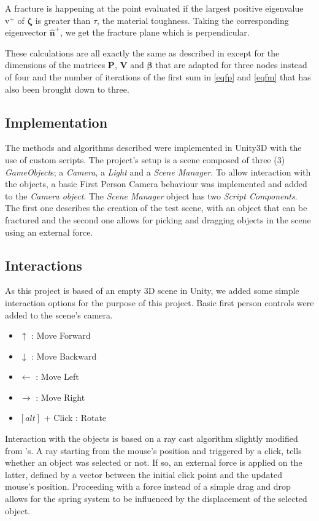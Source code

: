 \documentclass[tog]{acmsiggraph}
\begin{document}
A fracture is happening at the point evaluated if the largest positive eigenvalue $\mathrm{v}^+$ of $\pmb{\zeta}$ is greater than $\tau$, the material toughness. Taking the corresponding eigenvector $\mathrm{\pmb{\hat{n}}}^+$, we get the fracture plane which is perpendicular. 

These calculations are all exactly the same as described in \cite{Obrien:1999:GMA} except for the dimensions of the matrices $\pmb{P}$, $\pmb{V}$ and $\pmb{\beta}$ that are adapted for three nodes instead of four and the number of iterations of the first sum in \eqref{eqfp} and \eqref{eqfm} that has also been brought down to three. 

\subsection{Implementation}
The methods and algorithms described were implemented in Unity3D with the use of custom scripts. The project's setup is a scene composed of three (3) \textit{GameObject}s; a \textit{Camera}, a \textit{Light} and a \textit{Scene Manager}. To allow interaction with the objects, a basic First Person Camera behaviour was implemented and added to the \textit{Camera object}. The \textit{Scene Manager} object has two \textit{Script Components}. The first one describes the creation of the test scene, with an object that can be fractured and the second one allows for picking and dragging objects in the scene using an external force. 

\subsection{Interactions}
As this project is based of an empty 3D scene in Unity, we added some simple interaction options for the purpose of this project. Basic first person controls were added to the scene's camera. 

\begin{itemize}
\setlength\itemsep{0em}
\item $\uparrow$ : Move Forward
\item $\downarrow$ : Move Backward
\item $\leftarrow$ : Move Left
\item $\rightarrow$ : Move Right
\item $\left[alt\right]$ + Click : Rotate 
\end{itemize}

Interaction with the objects is based on a ray cast algorithm slightly modified from \cite{Drag}'s. A ray starting from the mouse's position and triggered by a click, tells whether an object was selected or not. If so, an external force is applied on the latter, defined by a vector between the initial click point and the updated mouse's position. Proceeding with a force instead of a simple drag and drop allows for the spring system to be influenced by the displacement of the selected object. 
\end{document}

